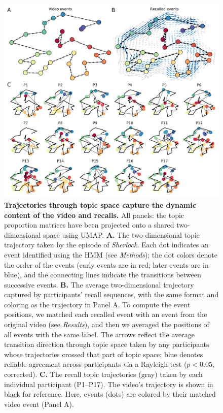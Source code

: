\documentclass{article}
\begin{document}
\begin{figure}[tp]
\centering
\includegraphics[width=1\textwidth]{figs/trajectory}
\caption{\small \textbf{Trajectories through topic space capture the dynamic content of the video and recalls.}  All panels: the topic proportion matrices have been projected onto a shared two-dimensional space using UMAP.  \textbf{A.} The two-dimensional topic trajectory taken by the episode of \textit{Sherlock}.  Each dot indicates an event identified using the HMM (see \textit{Methods}); the dot colors denote the order of the events (early events are in red; later events are in blue), and the connecting lines indicate the transitions between successive events.  \textbf{B.} The average two-dimensional trajectory captured by participants' recall sequences, with the same format and coloring as the trajectory in Panel A.  To compute the event positions, we matched each recalled event with an event from the original video (see \textit{Results}), and then we averaged the positions of all events with the same label.  The arrows reflect the average transition direction through topic space taken by any participants whose trajectories crossed that part of topic space; blue denotes reliable agreement across participants via a Rayleigh test ($p < 0.05$, corrected).  \textbf{C.} The recall topic trajectories (gray) taken by each individual participant (P1--P17).  The video's trajectory is shown in black for reference.  Here, events (dots) are colored by their matched video event (Panel A).}
\label{fig:trajectory}
\end{figure}
\end{document}
